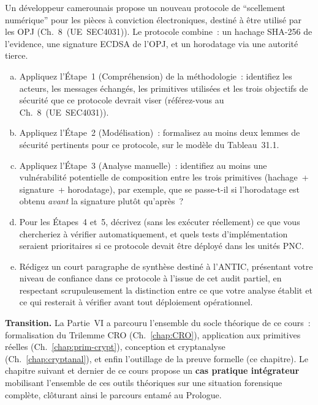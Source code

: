 \begin{boxexo}[title={\ding{45}\quad Exercice~31.3. Audit complet d'un protocole proposé \niveauexpert}]
Un développeur camerounais propose un nouveau protocole de
``scellement numérique'' pour les pièces à conviction électroniques,
destiné à être utilisé par les OPJ (Ch.~8~(UE~SEC4031)). Le
protocole combine~: un hachage SHA-256 de l'evidence, une signature
ECDSA de l'OPJ, et un horodatage via une autorité tierce.
\begin{enumerate}[(a)]
    \item Appliquez l'Étape~1 (Compréhension) de la méthodologie~:
          identifiez les acteurs, les messages échangés, les
          primitives utilisées et les trois objectifs de sécurité
          que ce protocole devrait viser (référez-vous au
          Ch.~8~(UE~SEC4031)).
    \item Appliquez l'Étape~2 (Modélisation)~: formalisez au moins
          deux lemmes de sécurité pertinents pour ce protocole,
          sur le modèle du Tableau~31.1.
    \item Appliquez l'Étape~3 (Analyse manuelle)~: identifiez au
          moins une vulnérabilité potentielle de composition entre
          les trois primitives (hachage~+ signature~+ horodatage), par exemple, que se passe-t-il si l'horodatage est
          obtenu \emph{avant} la signature plutôt qu'après~?
    \item Pour les Étapes~4 et~5, décrivez (sans les exécuter
          réellement) ce que vous chercheriez à vérifier
          automatiquement, et quels tests d'implémentation
          seraient prioritaires si ce protocole devait être
          déployé dans les unités PNC.
    \item Rédigez un court paragraphe de synthèse destiné à
          l'ANTIC, présentant votre niveau de confiance dans ce
          protocole à l'issue de cet audit partiel, en respectant
          scrupuleusement la distinction entre ce que votre analyse
          établit et ce qui resterait à vérifier avant tout
          déploiement opérationnel.
\end{enumerate}
\end{boxexo}

\bigskip

\begin{boxinfo}
\textbf{Transition.} La Partie~VI a parcouru l'ensemble du socle
théorique de ce cours~: formalisation du Trilemme CRO
(Ch.~\ref{chap:CRO}), application aux primitives réelles
(Ch.~\ref{chap:prim-crypt}), conception et cryptanalyse
(Ch.~\ref{chap:cryptanal}), et enfin l'outillage de la preuve
formelle (ce chapitre). Le chapitre suivant et dernier de ce cours
propose un \textbf{cas pratique intégrateur} mobilisant l'ensemble
de ces outils théoriques sur une situation forensique complète,
clôturant ainsi le parcours entamé au Prologue.
\end{boxinfo}